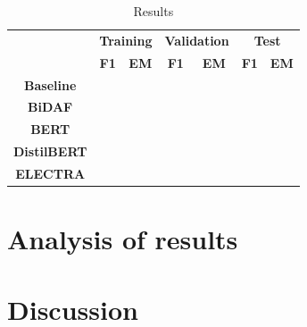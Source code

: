 \documentclass[a4paper,10pt]{report}
\begin{document}
\begin{table}[h]
  \center
  \begin{tabular}{|c|c|c|c|c|c|c|}
  \hline
  \multirow{2}{*}{}   & \multicolumn{2}{c|}{\textbf{Training}} & \multicolumn{2}{c|}{\textbf{Validation}} & \multicolumn{2}{c|}{\textbf{Test}} \\ \cline{2-7} 
                      & \textbf{F1}        & \textbf{EM}       & \textbf{F1}         & \textbf{EM}        & \textbf{F1}      & \textbf{EM}     \\ \hline
  \textbf{Baseline}   &                    &                   &                     &                    &                  &                 \\ \hline
  \textbf{BiDAF}      &                    &                   &                     &                    &                  &                 \\ \hline
  \textbf{BERT}       &                    &                   &                     &                    &                  &                 \\ \hline
  \textbf{DistilBERT} &                    &                   &                     &                    &                  &                 \\ \hline
  \textbf{ELECTRA}    &                    &                   &                     &                    &                  &                 \\ \hline
  \end{tabular}
  \caption{Results}
  \label{table:results}
\end{table}

\chapter{Analysis of results}\label{chap:analysis-results}

\chapter{Discussion}\label{chap:discussion}

\printbibliography
\end{document}
